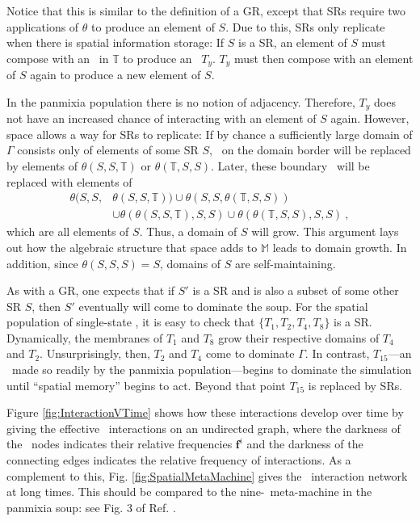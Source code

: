 \documentclass[pre,twocolumn,showpacs,superscriptaddress,preprintnumbers,floatfix]{revtex4}
\theoremstyle{plain}    \newtheorem{Lem}{Lemma}
\theoremstyle{plain}    \newtheorem*{ProLem}{Proof}
\theoremstyle{plain}    \newtheorem{Cor}{Corollary}
\theoremstyle{plain}    \newtheorem*{ProCor}{Proof}
\theoremstyle{plain}    \newtheorem{The}{Theorem}
\theoremstyle{plain}    \newtheorem*{ProThe}{Proof}
\theoremstyle{plain}    \newtheorem{Prop}{Proposition}
\theoremstyle{plain}    \newtheorem*{ProProp}{Proof}
\theoremstyle{plain}    \newtheorem*{Conj}{Conjecture}
\theoremstyle{plain}    \newtheorem*{Rem}{Remark}
\theoremstyle{plain}    \newtheorem{Def}{Definition}
\theoremstyle{plain}    \newtheorem*{Not}{Notation}
\newcommand{\T}{\mathbb{T}}
\newcommand{\M}{\mathbb{M}}
\newcommand{\PrEMType}{\mathbf{f}}
\begin{document}
Notice that this is similar to the definition of a GR, except that SRs require
two applications of $\theta$ to produce an element of $S$. Due to this, SRs
only replicate when there is spatial information storage: If $S$ is a SR, an
element of $S$ must compose with an \eM\ in $\T$ to produce an \eM\ $T_y$.
$T_y$ must then compose with an element of $S$ again to produce a new element
of $S$. 

In the panmixia population there is no notion of adjacency. Therefore, $T_y$
does not have an increased chance of interacting with an element of $S$ again.
However, space allows a way for SRs to replicate: If by chance a sufficiently
large domain of $\Gamma$ consists only of elements of some SR $S$, \eMs\ on
the domain border will be replaced by elements of $\theta(S, S, \T)$ or
$\theta(\T, S, S)$. Later, these boundary \eMs\ will be replaced with elements of 
\begin{align}
\theta(S,S, & \theta(S,S,\T)) \cup \theta(S,S,\theta(\T,S,S))
  \nonumber \\
  & \cup \theta(\theta(S,S,\T),S,S) \cup \theta(\theta(\T,S,S),S,S) ~, 
\end{align}
which are all elements of $S$. Thus, a domain of $S$ will grow. This argument
lays out how the algebraic structure that space adds to $\M$ leads to domain
growth. In addition, since $\theta(S, S, S) = S$, domains of $S$ are
self-maintaining.

As with a GR, one expects that if $S'$ is a SR and is also a subset of some
other SR $S$, then $S'$ eventually will come to dominate the soup. For the
spatial population of single-state \eMs, it is easy to check that
$\{ T_1, T_2, T_4, T_8 \}$ is a SR. Dynamically, the membranes of $T_1$ and
$T_8$ grow their respective domains of $T_4$ and $T_2$. Unsurprisingly, then,
$T_2$ and $T_4$ come to dominate $\Gamma$. In contrast, $T_{15}$---an \eM\ made
so readily by the panmixia population---begins to dominate the simulation until
``spatial memory'' begins to act. Beyond that point $T_{15}$ is replaced by SRs.

Figure \ref{fig:InteractionVTime} shows how these interactions develop over
time by giving the effective \eM\ interactions on an undirected graph, where
the darkness of the \eM\ nodes indicates their relative frequencies
$\PrEMType^i$ and the darkness of the connecting edges indicates the relative
frequency of interactions. As a complement to this,
Fig. \ref{fig:SpatialMetaMachine} gives
the \eM\ interaction network at long times. This should be compared to the
nine-\eM\ meta-machine in the panmixia soup: see Fig. 3 of Ref. \cite{OTMOMerge}.
\end{document}
